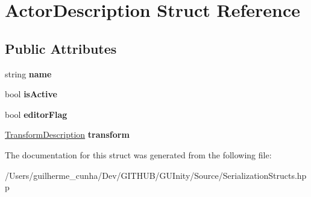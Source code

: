 \hypertarget{struct_actor_description}{}\section{Actor\+Description Struct Reference}
\label{struct_actor_description}
\subsection*{Public Attributes}
\begin{DoxyCompactItemize}
\item 
\hypertarget{struct_actor_description_ae5a739a425bed5c2bb5ec29453e50951}{}string {\bfseries name}\label{struct_actor_description_ae5a739a425bed5c2bb5ec29453e50951}

\item 
\hypertarget{struct_actor_description_afa78d4071f58976818b990e11d34b5ba}{}bool {\bfseries is\+Active}\label{struct_actor_description_afa78d4071f58976818b990e11d34b5ba}

\item 
\hypertarget{struct_actor_description_a05fceac8009484292a14b70ed1cfd12a}{}bool {\bfseries editor\+Flag}\label{struct_actor_description_a05fceac8009484292a14b70ed1cfd12a}

\item 
\hypertarget{struct_actor_description_a8aed8b63b24be0d28b73b7d00feac4f5}{}\hyperlink{struct_transform_description}{Transform\+Description} {\bfseries transform}\label{struct_actor_description_a8aed8b63b24be0d28b73b7d00feac4f5}

\end{DoxyCompactItemize}


The documentation for this struct was generated from the following file\+:\begin{DoxyCompactItemize}
\item 
/\+Users/guilherme\+\_\+cunha/\+Dev/\+G\+I\+T\+H\+U\+B/\+G\+U\+Inity/\+Source/Serialization\+Structs.\+hpp\end{DoxyCompactItemize}
